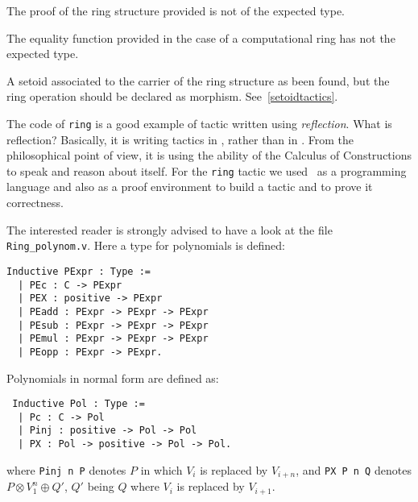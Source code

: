 \begin{ErrMsgs}
\item {}
  The proof of the ring structure provided is not of the expected type.
\item {}
  The equality function provided in the case of a computational ring
  has not the expected type.
\item {}
  A setoid associated to the carrier of the ring structure as been
  found, but the ring operation should be declared as
  morphism. See~\ref{setoidtactics}.
\end{ErrMsgs}


The code of \texttt{ring} is a good example of tactic written using
\textit{reflection}.  What is reflection? Basically, it is writing
\Coq{} tactics in \Coq, rather than in \ocaml. From the philosophical
point of view, it is using the ability of the Calculus of
Constructions to speak and reason about itself.  For the \texttt{ring}
tactic we used \Coq\ as a programming language and also as a proof
environment to build a tactic and to prove it correctness.

The interested reader is strongly advised to have a look at the file
\texttt{Ring\_polynom.v}. Here a type for polynomials is defined: 

\begin{small}
\begin{flushleft}
\begin{verbatim}
Inductive PExpr : Type :=
  | PEc : C -> PExpr
  | PEX : positive -> PExpr
  | PEadd : PExpr -> PExpr -> PExpr
  | PEsub : PExpr -> PExpr -> PExpr
  | PEmul : PExpr -> PExpr -> PExpr
  | PEopp : PExpr -> PExpr.
\end{verbatim}
\end{flushleft}
\end{small}

Polynomials in normal form are defined as:
\begin{small}
\begin{flushleft}
\begin{verbatim}
 Inductive Pol : Type :=
  | Pc : C -> Pol 
  | Pinj : positive -> Pol -> Pol                   
  | PX : Pol -> positive -> Pol -> Pol.
\end{verbatim}
\end{flushleft}
\end{small}
where {\tt Pinj n P} denotes $P$ in which $V_i$ is replaced by
$V_{i+n}$, and {\tt PX P n Q} denotes $P \otimes V_1^{n} \oplus Q'$,
$Q'$ being $Q$ where $V_i$ is replaced by $V_{i+1}$. 


